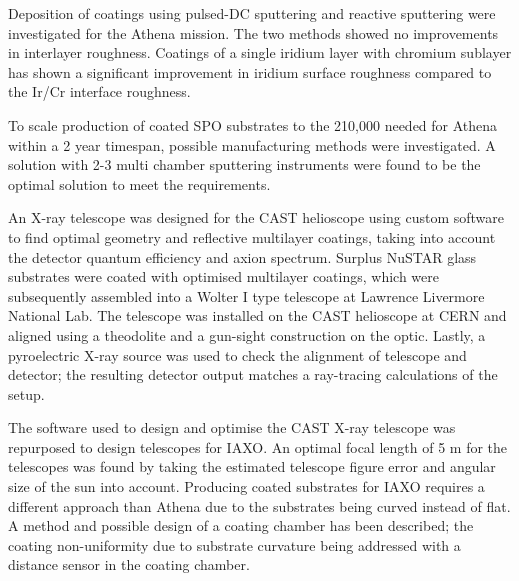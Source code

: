 Deposition of coatings using pulsed-DC sputtering and reactive sputtering were investigated for the Athena mission. The two methods showed no improvements in interlayer roughness. Coatings of a single iridium layer with chromium sublayer has shown a significant improvement in iridium surface roughness compared to the Ir/Cr interface roughness.

To scale production of coated SPO substrates to the 210,000 needed for Athena within a 2 year timespan, possible manufacturing methods were investigated. A solution with 2-3 multi chamber sputtering instruments were found to be the optimal solution to meet the requirements.

An X-ray telescope was designed for the CAST helioscope using custom software to find optimal geometry and reflective multilayer coatings, taking into account the detector quantum efficiency and axion spectrum. Surplus NuSTAR glass substrates were coated with optimised multilayer coatings, which were subsequently assembled into a Wolter I type telescope at Lawrence Livermore National Lab. The telescope was installed on the CAST helioscope at CERN and aligned using a theodolite and a gun-sight construction on the optic. Lastly, a pyroelectric X-ray source was used to check the alignment of telescope and detector; the resulting detector output matches a ray-tracing calculations of the setup.

The software used to design and optimise the CAST X-ray telescope was repurposed to design telescopes for IAXO. An optimal focal length of 5 m for the telescopes was found by taking the estimated telescope figure error and angular size of the sun into account. Producing coated substrates for IAXO requires a different approach than Athena due to the substrates being curved instead of flat. A method and possible design of a coating chamber has been described; the coating non-uniformity due to substrate curvature being addressed with a distance sensor in the coating chamber.

